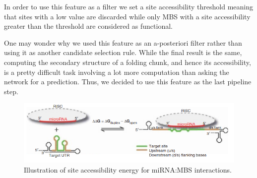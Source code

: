 In order to use this feature as a filter we set a site accessibility threshold meaning that sites with a low value are discarded while only MBS with a site accessibility greater than the threshold are considered as functional. 

One may wonder why we used this feature as an a-posteriori filter rather than using it as another candidate selection rule. While the final result is the same, computing the secondary structure of a folding chunk, and hence its accessibility, is a pretty difficult task involving a lot more computation than asking the network for a prediction. Thus, we decided to use this feature as the last pipeline step.

\begin{figure}[hbt!]
	\centering
	\includegraphics[width=1\textwidth]{Figures/site_accessibility}
	\caption{Illustration of site accessibility energy for miRNA:MBS interactions.}
	\label{fig:site_accessibility}
\end{figure}




